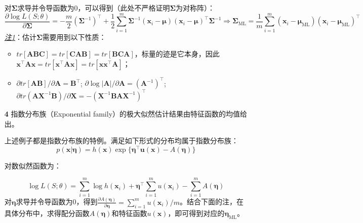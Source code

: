 \documentclass{article}
\begin{document}
\begin{itemize}
\begin{scriptsize}
\begin{spacing}{1.2}
{	对$\bm{\Sigma}$求导并令导函数为0，可以得到（此处不严格证明$\bm{\Sigma}$为对称阵）：
	\begin{equation*}
	\frac{\partial \log L(S;\theta)}{\partial \bm{\Sigma}} = -\frac{m}{2} (\bm{\Sigma}^{-1})^\top + \frac{1}{2} \sum_{i=1}^m  \bm{\Sigma}^{-1} (\bm{x}_i - \bm{\mu})(\bm{x}_i - \bm{\mu})^\top \bm{\Sigma}^{-1} \Rightarrow \bm{\Sigma}_{\mathrm{ML}} = \frac{1}{m}\sum_{i=1}^m (\bm{x}_i - \bm{\mu}_{\mathrm{ML}})(\bm{x}_i - \bm{\mu}_{\mathrm{ML}})^\top
	\end{equation*}
	\textit{\underline{注1}}：估计$\bm{\Sigma}$需要用到以下性质：	
	\begin{itemize}
	\item $tr[\bm{A}\bm{B}\bm{C}]=tr[\bm{C}\bm{A}\bm{B}]=tr[\bm{B}\bm{C}\bm{A}]$，标量的迹是它本身，因此$\bm{x}^\top \bm{A} \bm{x} = tr[\bm{x}^\top \bm{A} \bm{x}] = tr[\bm{x} \bm{x}^\top \bm{A}]$；
	\item $\partial tr[\bm{A} \bm{B}]/\partial \bm{A} = \bm{B}^\top$; $\partial \log |\bm{A}|/\partial \bm{A} = (\bm{A}^{-1})^\top$; $\partial tr(\bm{A}\bm{X}^{-1}\bm{B})/\partial \bm{X} = -(\bm{X}^{-1} \bm{BA}\bm{X}^{-1})^\top$
	\end{itemize}
	}
	\end{spacing}
	\end{scriptsize}
	\vspace{-2mm}
	
	\item [\textbf{4}] 指数分布族（Exponential family）的极大似然估计结果由特征函数的均值给出。
	
	上述例子都是指数分布族的特例。满足如下形式的分布均属于指数分布族：
	\begin{equation}
	p(\bm{x}|\bm{\eta}) = h(\bm{x}) \exp\{ \bm{\eta}^\top \bm{u}(\bm{x}) - A(\bm{\eta}) \}
	\end{equation}

	\begin{scriptsize}
	\begin{spacing}{1.2}
	{\sffamily

	对数似然函数为：
	
	\begin{equation*}
	\log L(S;\theta) = \sum_{i=1}^m \log h(\bm{x}_i) + \bm{\eta}^\top \sum_{i=1}^m u(\bm{x}_i) - \sum_{i=1}^m A(\bm{\eta})
	\end{equation*}
对$\bm{\eta}$求导并令导函数为0，得到$\frac{\partial A(\bm{\eta})}{\partial \bm{\eta}} = \sum_{i=1}^m u(\bm{x}_i)/m$。结合下面的注，在具体分布中，求得配分函数$A(\bm{\eta})$和特征函数$u(\bm{x})$，即可得到对应的$\bm{\eta}_\mathrm{ML}$。
	
}
\end{spacing}
\end{scriptsize}
\end{itemize}
\end{document}
